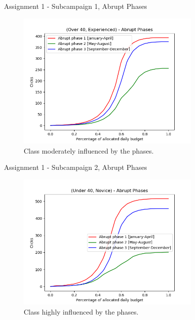 \documentclass[11pt]{beamer}
\begin{document}
\begin{frame}{Assignment 1 - Subcampaign 1, Abrupt Phases}
\begin{figure}[hbtp]
\centering
\includegraphics[width=0.8\textwidth]{images/subcampaign_1_abrupt_phases.png}
\caption{Class moderately influenced by the phases.}
\end{figure}
\end{frame}

\begin{frame}{Assignment 1 - Subcampaign 2, Abrupt Phases}
\begin{figure}[hbtp]
\centering
\includegraphics[width=0.8\textwidth]{images/subcampaign_2_abrupt_phases.png}
\caption{Class highly influenced by the phases.}
\end{figure}
\end{frame}
\end{document}
